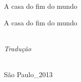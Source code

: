 
{\centering\vspace*{10em}\thispagestyle{empty}
{\huge A casa do fim do mundo\par}}

\cleardoublepage

{\centering\vspace*{10em}\thispagestyle{empty}
{\huge A casa do fim do mundo\par}\bigskip
{\Large{}}

\vspace*{10em}
{}\\
{\small\textit{Tradução}}\medskip

\vfill

\logoum\\
{\normalsize São Paulo\_2013}\par}

\clearpage

